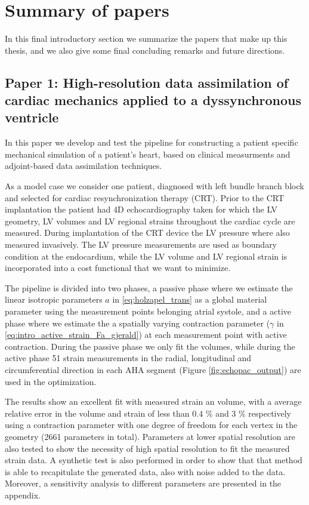 
\section{Summary of papers}
In this final introductory section we summarize the papers that make
up this thesis, and we also give some final concluding remarks
and future directions. 

\subsection{Paper 1: High-resolution data assimilation of cardiac mechanics
  applied to a dyssynchronous ventricle}
In this paper we develop and test the pipeline for constructing a
patient specific mechanical simulation of a patient's heart, based on
clinical measurments and adjoint-based data assimilation
techniques.

As a model case we consider one patient, diagnosed with
left bundle branch block and selected for cardiac resynchronization
therapy (CRT). Prior to the CRT implantation the patient had 4D
echocardiography taken for which the LV geometry, LV volumes and LV
regional strains throughout the cardiac cycle are measured. During
implantation of the CRT device the LV pressure where also measured
invasively. The LV pressure measurements are used as boundary condition at the
endocardium, while the LV volume and LV regional strain is incorporated
into a cost functional that we want to minimize.

The pipeline is divided into two phases, a passive phase where we
estimate the linear isotropic parameters $a$ in
\eqref{eq:holzapel_trans} as a global material parameter using the
measurement points belonging atrial systole, and a active phase where we estimate the
a spatially varying contraction parameter ($\gamma$ in
\eqref{eq:intro_active_strain_Fa_gjerald}) at each measurement point
with active contraction. During the passive phase we only fit the
volumes, while during the active phase 51 strain measurements in the radial,
longitudinal and circumferential direction in each AHA segment (Figure
\ref{fig:echopac_output}) are used in the optimization. 

The results show an excellent fit with measured strain an volume, with
a average relative error in the volume and strain of less than 0.4 \% and 3 \%
respectively using a contraction parameter with one degree of freedom
for each vertex in the geometry (2661 parameters in total). Parameters
at lower spatial resolution are also tested to show the necessity of
high spatial resolution to fit the measured strain data.
A synthetic test is also performed in order to show that that method
is able to recapitulate the generated data, also with noise added to
the data. Moreover, a sensitivity analysis to different parameters are
presented in the appendix.


